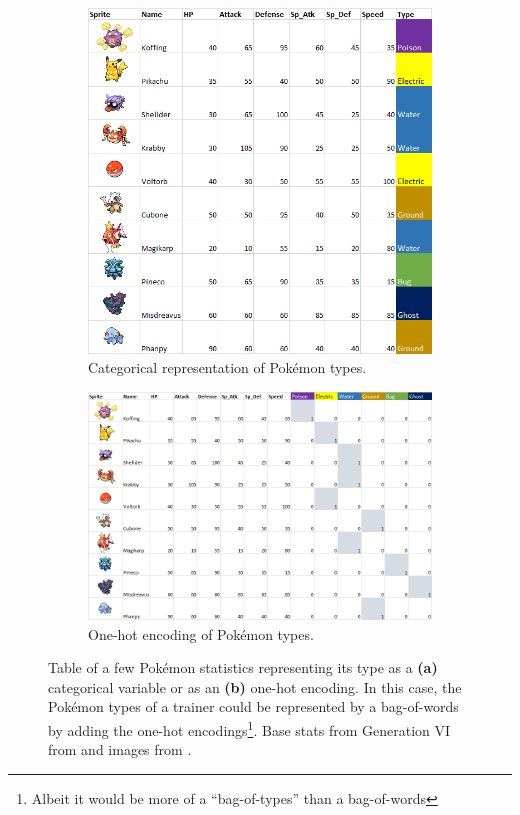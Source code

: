 \begin{figure}
\centering
\begin{subfigure}{.5\textwidth}
  \centering
  \includegraphics[width=1\linewidth]{figuras/pokemon_cate.png}
  \caption{Categorical representation of Pokémon types.}
  \label{fig:pokecat}
\end{subfigure}
\begin{subfigure}{.7\textwidth}
  \centering
  \includegraphics[width=1\linewidth]{figuras/pokemon1hot.png}
  \caption{One-hot encoding of Pokémon types.}
  \label{fig:pokehot}
\end{subfigure}
\caption{Table of a few Pokémon statistics representing its type as a \textbf{(a)} categorical variable or as an \textbf{(b)} one-hot encoding. In this case, the Pokémon types of a trainer could be represented by a bag-of-words by adding the one-hot encodings\footnote{Albeit it would be more of a ``bag-of-types'' than a bag-of-words}. Base stats from Generation VI from \citet{bulbapedia} and images from \citet{hotpokemon}.}
\label{fig:poke}
\end{figure}




